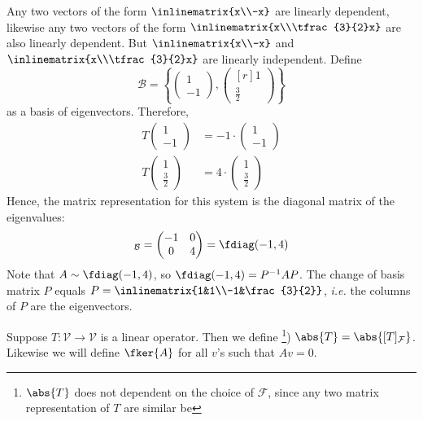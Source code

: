 \begin{rem}
	Any two vectors of the form $\inlinematrix{x\\-x}$
	are linearly dependent, likewise any two vectors of the form $\inlinematrix{x\\\tfrac{3}{2}x}$
	are also linearly dependent. But $\inlinematrix{x\\-x}$ and
	$\inlinematrix{x\\\tfrac{3}{2}x}$ are linearly independent.
	Define
	\begin{equation*}
		\mathcal{B}=\left\{\begin{pmatrix}
			1 \\ -1
		\end{pmatrix},
		\begin{pmatrix}[r]
			1 \\ \frac{3}{2}
		\end{pmatrix}\right\}
	\end{equation*}
	as a basis of eigenvectors. Therefore,
	\begin{align*}
		T\begin{pmatrix}1\\-1\end{pmatrix} & =-1\cdot\begin{pmatrix}1\\-1\end{pmatrix} \\
		T\begin{pmatrix}1\\\frac{3}{2}\end{pmatrix} & =4\cdot\begin{pmatrix}1\\\frac{3}{2}\end{pmatrix}
	\end{align*}
	Hence, the matrix representation for this system is the diagonal matrix of the eigenvalues:
	\begin{equation*}
		[T]_\mathcal{B}=\begin{pmatrix}
			-1 & 0 \\
			0  & 4
		\end{pmatrix}=\fdiag(-1,4)
	\end{equation*}
	Note that $A \sim \fdiag(-1,4)$, so $\fdiag(-1,4)=P^{-1}AP$. The change of basis
	matrix $P$ equals $P=\inlinematrix{1&1\\-1&\frac{3}{2}}$,
	\textit{i.e.} the columns of $P$ are the eigenvectors.
\end{rem}

\begin{definition}\label{def-determinant-kernel-alt}
	Suppose $T:\mathcal{V}\to\mathcal{V}$ is a linear operator. Then we define
	\footnote{$\abs{T}$ does not dependent on the choice of $\mathcal{F}$, since
		any two matrix representation of $T$ are similar be })
	$\abs{T}=\abs{[T]_\mathcal{F}}$. Likewise we will define $\fker{A}$ for all
	$v$'s such that $Av=0$.
\end{definition}

